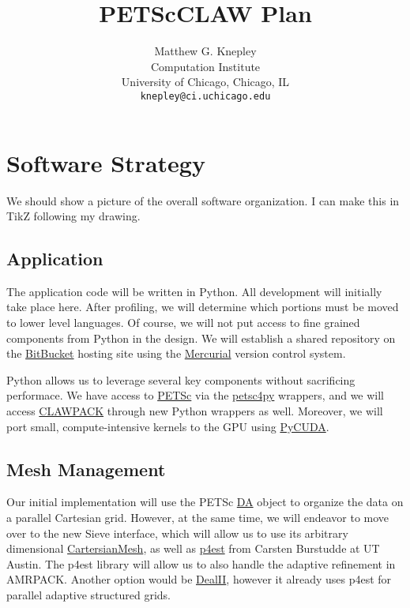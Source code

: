 \documentclass[12pt]{article}
\title{PETScCLAW Plan}
\author{Matthew G. Knepley\\
\small Computation Institute\\[-0.8ex]
\small University of Chicago, Chicago, IL\\
\small \texttt{knepley@ci.uchicago.edu}\\
}
\begin{document}
\maketitle

\section{Software Strategy}

  We should show a picture of the overall software organization. I can make this in TikZ following my drawing.

\subsection{Application}

The application code will be written in Python. All development will initially take place here. After profiling, we
will determine which portions must be moved to lower level languages. Of course, we will not put access to fine grained
components from Python in the design. We will establish a shared repository on the
\href{http://www.bitbucket.org}{BitBucket} hosting site using the \href{http://mercurial.selenic.com}{Mercurial} version
control system.

Python allows us to leverage several key components without sacrificing performace. We have access to
\href{http://www.mcs.anl.gov/petsc}{PETSc} via the \href{http://code.google.com/p/petsc4py}{petsc4py} wrappers, and we
will access \href{http://www.amath.washington.edu/~claw/clawpack.org}{CLAWPACK} through new Python wrappers as
well. Moreover, we will port small, compute-intensive kernels to the GPU using
\href{http://mathema.tician.de/software/pycuda}{PyCUDA}.

\subsection{Mesh Management}

Our initial implementation will use the PETSc
\href{http://www.mcs.anl.gov/petsc/petsc-as/snapshots/petsc-current/docs/manualpages/DA/index.html}{DA} object to
organize the data on a parallel Cartesian grid. However, at the same time, we will endeavor to move over to the new
Sieve interface, which will allow us to use its arbitrary dimensional \href{}{CartersianMesh}, as well as \href{}{p4est}
from Carsten Burstudde at UT Austin. The p4est library will allow us to also handle the adaptive refinement in
AMRPACK. Another option would be \href{}{DealII}, however it already uses p4est for parallel adaptive structured grids.
\end{document}
